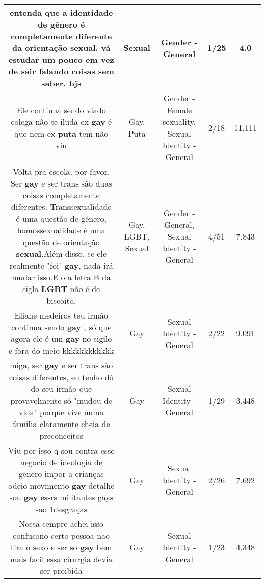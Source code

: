 \documentclass[11pt]{article}
\newlength\mylength
\begin{document}
\begin{center}
\begin{longtable}{|C{.65\mylength}|C{.30\mylength}|C{.12\mylength}|C{.12\mylength}|C{.12\mylength}|}
  \small entenda que a identidade de gênero é completamente diferente da orientação \textbf{sexual}. vá estudar um pouco em vez de sair falando coisas sem saber. bjs\normalsize   & Sexual & Gender - General & 1/25 & 4.0 \\  \hline
  \small Ele continua sendo viado colega não se iluda ex \textbf{gay} é que nem ex \textbf{puta} tem não viu\normalsize   & Gay, Puta & Gender - Female sexuality, Sexual Identity - General & 2/18 & 11.111 \\  \hline
  \small Volta pra escola, por favor. Ser \textbf{gay} e ser trans são duas coisas completamente diferentes. Transsexualidade é uma questão de gênero, homossexualidade é uma questão de orientação \textbf{sexual}.Além disso, se ele realmente "foi" \textbf{gay}, nada irá mudar isso.E o a letra B da sigla \textbf{LGBT} não é de biscoito.\normalsize   & Gay, LGBT, Sexual & Gender - General, Sexual Identity - General & 4/51 & 7.843 \\  \hline
  \small Eliane medeiros  teu irmão continua sendo \textbf{gay} , só que agora ele é um \textbf{gay} no sigilo e fora do meio  kkkkkkkkkkkk\normalsize   & Gay & Sexual Identity - General & 2/22 & 9.091 \\  \hline
  \small miga, ser \textbf{gay} e ser trans são coisas diferentes, eu tenho dó do seu irmão que provavelmente só "mudou de vida" porque vive numa familia claramente cheia de preconceitos\normalsize   & Gay & Sexual Identity - General & 1/29 & 3.448 \\  \hline
  \small Viu por isso q sou contra esse negocio de ideologia de genero impor a crianças odeio movimento \textbf{gay} detalhe sou \textbf{gay} essrs militantes gays sao 1desgraças\normalsize   & Gay & Sexual Identity - General & 2/26 & 7.692 \\  \hline
  \small Nossa sempre achei isso confusono certo pessoa nao tira o sexo e ser so \textbf{gay} bem mais facil essa cirurgia devia ser proibida\normalsize   & Gay & Sexual Identity - General & 1/23 & 4.348 \\  \hline

\end{longtable}
\end{center}
\end{document}
